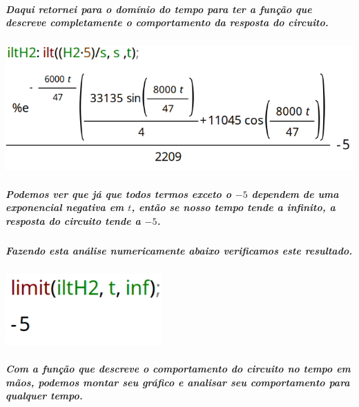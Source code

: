 \documentclass[12pt,twoside, a4paper, twocolumn]{article}
\begin{document}
\pagebreak


\subparagraph*{Daqui retornei para o domínio do tempo para ter a função que descreve completamente o comportamento  da resposta do circuito.}


\subparagraph*{}




\begin{adjustbox}{scale=0.35}
    \includegraphics{iltH2.png}
\end{adjustbox}




\subparagraph*{Podemos ver que já que todos termos exceto o $-5$ dependem de uma exponencial negativa em $t$, então se nosso tempo tende a infinito, a resposta do circuito tende a $-5$.}


\subparagraph*{Fazendo esta análise numericamente abaixo verificamos este resultado.}


\subparagraph*{}


\begin{adjustbox}{scale=0.4}
    \includegraphics{limH2.png}
\end{adjustbox}


\subparagraph*{Com a função que descreve o comportamento do circuito no tempo em mãos, podemos montar seu gráfico e analisar seu comportamento para qualquer tempo.}


\newpage
\end{document}
